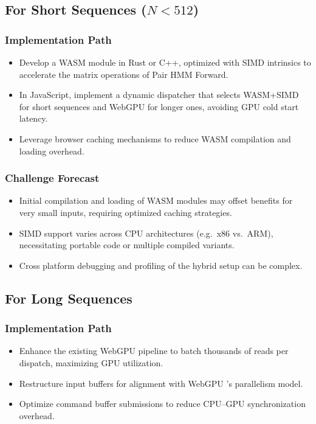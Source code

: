 \documentclass[PhD]{PHlab-thesis}
\begin{document}
\subsection{For Short Sequences (\(N < 512\))}

\subsubsection*{Implementation Path}
\begin{itemize}
  \item Develop a WASM module in Rust or C++, optimized with SIMD intrinsics to accelerate the matrix operations of Pair HMM Forward.
  \item In JavaScript, implement a dynamic dispatcher that selects WASM+SIMD for short sequences and WebGPU for longer ones, avoiding GPU cold start latency.
  \item Leverage browser caching mechanisms to reduce WASM compilation and loading overhead.
\end{itemize}

\subsubsection*{Challenge Forecast}
\begin{itemize}
  \item Initial compilation and loading of WASM modules may offset benefits for very small inputs, requiring optimized caching strategies.
  \item SIMD support varies across CPU architectures (e.g.\ x86 vs.\ ARM), necessitating portable code or multiple compiled variants.
  \item Cross platform debugging and profiling of the hybrid setup can be complex.
\end{itemize}

\subsection{For Long Sequences}

\subsubsection*{Implementation Path}
\begin{itemize}
  \item Enhance the existing WebGPU pipeline to batch thousands of reads per dispatch, maximizing GPU utilization.
  \item Restructure input buffers for alignment with WebGPU 's parallelism model.
  \item Optimize command buffer submissions to reduce CPU–GPU synchronization overhead.
\end{itemize}
\end{document}

